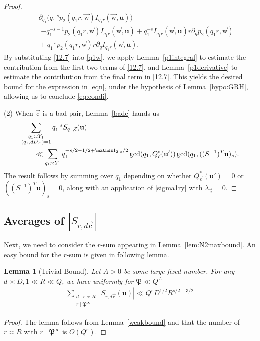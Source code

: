 \documentclass[letterpaper,11pt]{amsart}
\numberwithin{equation}{section}
\newtheorem{lemma}[theorem]{Lemma}
\theoremstyle{definition}
\numberwithin{equation}{section}
\newcommand{\uu}{\mathbf{u}}
\newcommand{\uw}{{\vec{\mathrm{w}}}}
\newcommand{\uc}{{\vec{\mathrm{c}}}}
\newcommand{\ve}{\varepsilon}
\begin{document}
\begin{proof}
\begin{equation}
\begin{split}\label{12.7}
&\quad \partial_{q_1}\big(q_1^{-s} p_{2}(q_1r,\uw) I_{q_1r}(\uw,\uu)\big)\\&=-q_1^{-s-1} p_{2}(q_1r,\uw) I_{q_1r}(\uw,\uu)+q_1^{-s}I_{q_1r}(\uw,\uu)r\partial_q  p_{2}(q_1r,\uw)\\ & \quad +q_1^{-s} p_{2}(q_1r,\uw)r\partial_{q}I_{q_1r}(\uw,\uu).
\end{split}
\end{equation}
By substituting \eqref{12.7} into \eqref{q1w}, we apply Lemma~\ref{p1integral} to estimate the contribution from the first two terms of \eqref{12.7}, and Lemma~\ref{p1derivative} to estimate the contribution from the final term in \eqref{12.7}. This yields the desired bound for the expression in \eqref{eqn}, under the hypothesis of Lemma~\ref{hypo:GRH}, allowing us to conclude \eqref{eq:condi}.

(2)
When $\uc$ is a bad pair, Lemma~\ref{badc} hands us
\begin{align*}
\MoveEqLeft \sum_{\substack{q_1\asymp Y_1\\ (q_1, dD_F)=1}}q_1^{-s}S_{q_1, \uc}(\uu) \\ & \ll \sum_{q_1\asymp Y_1}
q_1^{-s/2-1/2+\mathds 1_{2\mid s}/2}\gcd(q_1,Q_\uc^*(\uu'))\gcd(q_1,((S^{-1})^T\uu)_s).
\end{align*}
The result follows by summing over $q_1$ depending on whether $Q_\uc^*(\uu')=0$ or $((S^{-1})^T\uu)_s=0$,  along with an application of \eqref{sigma1ry} with $\lambda_\uc=0$.
\end{proof}


\subsection{Averages of $|S_{r,d\uc}|$}

Next, we need to consider the $r$-sum appearing in Lemma~\ref{lem:N2maxbound}. 
An easy bound for the $r$-sum is given in following lemma.\begin{lemma}[Trivial Bound]\label{rsumbound}
Let $A>0$ be some large fixed number. 
For any $d\asymp D, 1\ll R\ll Q$, we have uniformly for $\mathfrak P\ll Q^A$ 
\begin{align*}
\sum_{\substack{d\mid r\asymp R\\ r\mid \mathfrak P^\infty}}|S_{r, d\uc}(\uu)|\ll Q^\ve D^{1/2} R^{s/2+3/2}
\end{align*}
\end{lemma}
\begin{proof}
The lemma follows from Lemma~\ref{weakbound} and that the number of $r\asymp R$ with $r\mid \mathfrak P^\infty$ is $O(Q^\ve)$. 
\end{proof}
\end{document}
